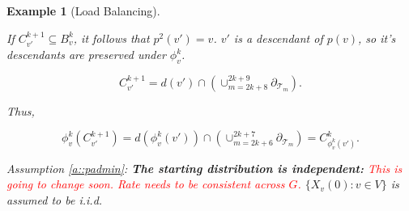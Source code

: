 \documentclass[12pt]{article}
\newcommand{\mc}{\mathcal}
\newcommand{\tr}{\textcolor{red}}
\newcommand{\bdry}[1]{\partial_{#1}}				%
\newcommand{\indx}[1]{^{#1}}						%
\newcommand{\Xf}{X}									%
\newcommand{\vind}[1]{_{#1}}						%
\newcommand{\tme}[1]{(#1)}							%
\newcommand{\tree}[1]{\mc{T}_{#1}}					%
\newcommand{\desc}{d}								%
\newtheorem{example}[thms]{Example}
\begin{document}
\begin{example}[Load Balancing]
\begin{description}
\begin{enumerate}[(a)]
If \(C\indx{k+1}_{v'} \subseteq B\indx{k}_v\), it follows that \(p^2(v') = v\). \(v'\) is a descendant of \(p(v)\), so it's descendants are preserved under \(\phi\indx{k}_v\).

\[C\indx{k+1}_{v'} = \desc(v')\cap \left(\cup_{m=2k+8}^{2k+9}\bdry{\tree{m}}\right).\]

Thus,

\[\phi\indx{k}_v(C\indx{k+1}_{v'}) = \desc(\phi\indx{k}_v(v'))\cap \left(\cup_{m=2k+6}^{2k+7}\bdry{\tree{m}}\right) = C\indx{k}_{\phi\indx{k}_v(v')}.\]
\end{enumerate}

\item[] Assumption \ref{a::padmin}: \textbf{The starting distribution is independent:} \tr{This is going to change soon. Rate needs to be consistent across \(G\).} \(\{\Xf\vind{v}\tme{0}:v \in V\}\) is assumed to be i.i.d. 
\end{description}

\end{example}
\end{document}
